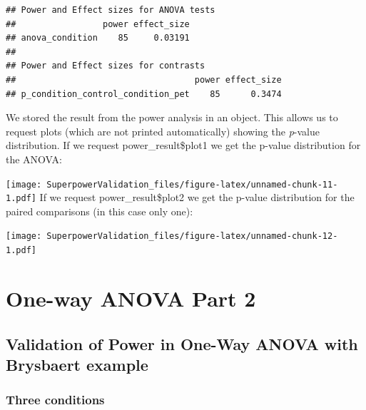 \documentclass[]{book}
\newenvironment{Shaded}{\begin{snugshade}}{\end{snugshade}}
\newcommand{\NormalTok}[1]{#1}
\newcommand{\OperatorTok}[1]{\textcolor[rgb]{0.81,0.36,0.00}{\textbf{#1}}}
\begin{document}
\begin{verbatim}
## Power and Effect sizes for ANOVA tests
##                 power effect_size
## anova_condition    85     0.03191
## 
## Power and Effect sizes for contrasts
##                                   power effect_size
## p_condition_control_condition_pet    85      0.3474
\end{verbatim}

We stored the result from the power analysis in an object. This allows us to request plots (which are not printed automatically) showing the \emph{p}-value distribution. If we request power\_result\$plot1 we get the p-value distribution for the ANOVA:

\begin{Shaded}
\end{Shaded}

\texttt{[image: SuperpowerValidation\_files/figure-latex/unnamed-chunk-11-1.pdf]}
If we request power\_result\$plot2 we get the p-value distribution for the paired comparisons (in this case only one):

\begin{Shaded}
\end{Shaded}

\texttt{[image: SuperpowerValidation\_files/figure-latex/unnamed-chunk-12-1.pdf]}

\hypertarget{one-way-anova-part-2}{%
\chapter{One-way ANOVA Part 2}\label{one-way-anova-part-2}}

\hypertarget{validation-of-power-in-one-way-anova-with-brysbaert-example}{%
\section{Validation of Power in One-Way ANOVA with Brysbaert example}\label{validation-of-power-in-one-way-anova-with-brysbaert-example}}

\hypertarget{three-conditions}{%
\subsection{Three conditions}\label{three-conditions}}
\end{document}
